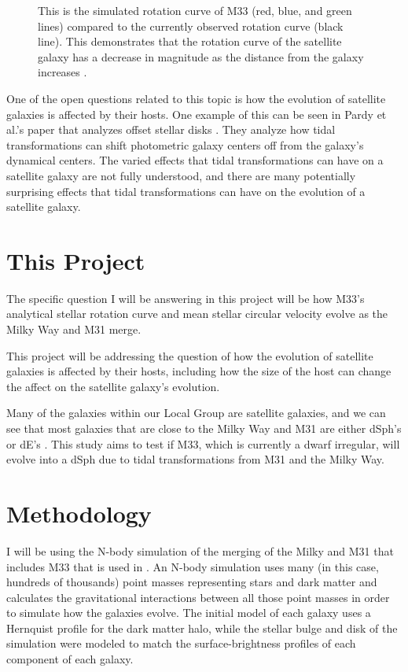 \documentclass[trackchanges, twocolumn]{aastex7}
\begin{document}
\begin{figure}[ht!] \label{M33RotationCurve}
\caption{ This is the simulated rotation curve of M33 (red, blue, and green lines) compared to the currently observed rotation curve (black line). This demonstrates that the rotation curve of the satellite galaxy has a decrease in magnitude as the distance from the galaxy increases \citep{Semczuk2018}.
\label{fig:general}}
\end{figure}

One of the open questions related to this topic is how the evolution of satellite galaxies is affected by their hosts. One example of this can be seen in Pardy et al.'s paper that analyzes offset stellar disks \citep{Pardy2016}. They analyze how tidal transformations can shift photometric galaxy centers off from the galaxy's dynamical centers. The varied effects that tidal transformations can have on a satellite galaxy are not fully understood, and there are many potentially surprising effects that tidal transformations can have on the evolution of a satellite galaxy.

\section{This Project} \label{sec:style}

The specific question I will be answering in this project will be how M33's analytical stellar rotation curve and mean stellar circular velocity evolve as the Milky Way and M31 merge.

This project will be addressing the question of how the evolution of satellite galaxies is affected by their hosts, including how the size of the host can change the affect on the satellite galaxy's evolution.

Many of the galaxies within our Local Group are satellite galaxies, and we can see that most galaxies that are close to the Milky Way and M31 are either dSph's or dE's \citep{Mayer2001}. This study aims to test if M33, which is currently a dwarf irregular, will evolve into a dSph due to tidal transformations from M31 and the Milky Way.
\newline
\section{Methodology}

I will be using the N-body simulation of the merging of the Milky and M31 that includes M33 that is used in \cite{MarelBesla2012}. An N-body simulation uses many (in this case, hundreds of thousands) point masses representing stars and dark matter and calculates the gravitational interactions between all those point masses in order to simulate how the galaxies evolve. The initial model of each galaxy uses a Hernquist profile \citep{Hernquist1990} for the dark matter halo, while the stellar bulge and disk of the simulation were modeled to match the surface-brightness profiles of each component of each galaxy. 
\end{document}
